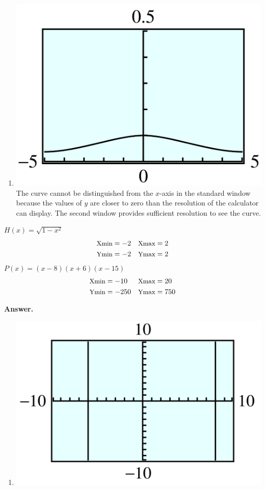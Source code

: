 \documentclass[10pt,]{book}
\theoremstyle{plain}
\theoremstyle{definition}
\theoremstyle{definition}
\theoremstyle{definition}
\theoremstyle{definition}
\numberwithin{equation}{part}
\newcommand{\amp}{&}
\begin{document}
\begin{exerciselist}
\begin{exercisegroup}
\begin{enumerate}[label=*\alph**]
%
\item\hypertarget{li-836}{}\includegraphics[width=0.6\linewidth]{images/fig-ans-GC-curve-near-x-axis.jpg}
 The curve cannot be distinguished from the \(x\)-axis in the standard window because the values of \(y\) are closer to zero than the resolution of the calculator can display. The second window provides sufficient resolution to see the curve.%
\end{enumerate}
%
\exercise[38.]\hypertarget{exercise-195}{}\(H(x) =\sqrt{1-x^2} \)%
\begin{align*}
{\small\text{Xmin}} \amp = -2 \amp\amp {\small\text{Xmax}} = 2
\\
{\small\text{Ymin}} \amp = -2 \amp\amp {\small\text{Ymax}} = 2
\end{align*}
%
\exercise[39.]\hypertarget{exercise-196}{}\(P(x) = (x - 8)(x + 6)(x - 15)\)%
\begin{align*}
{\small\text{Xmin}} \amp = -10 \amp\amp {\small\text{Xmax}} = 20
\\
{\small\text{Ymin}} \amp = -250 \amp\amp {\small\text{Ymax}} = 750
\end{align*}
%
\par\smallskip
\noindent\textbf{Answer.}\hypertarget{answer-112}{}\quad
\leavevmode%
\begin{enumerate}[label=*\alph**]
\item\hypertarget{li-837}{}\includegraphics[width=0.6\linewidth]{images/fig-ans-GC-vertical-lines-in-standard-window.jpg}

\end{enumerate}
\end{exercisegroup}
\end{exerciselist}
\end{document}
